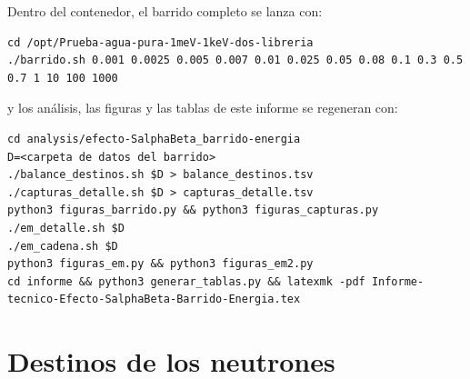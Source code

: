 \documentclass[11pt,a4paper]{article}
\renewcommand{\arraystretch}{1.18}
\begin{document}
Dentro del contenedor, el barrido completo se lanza con:
\begin{lstlisting}
cd /opt/Prueba-agua-pura-1meV-1keV-dos-libreria
./barrido.sh 0.001 0.0025 0.005 0.007 0.01 0.025 0.05 0.08 0.1 0.3 0.5 0.7 1 10 100 1000
\end{lstlisting}
y los análisis, las figuras y las tablas de este informe se regeneran con:
\begin{lstlisting}
cd analysis/efecto-SalphaBeta_barrido-energia
D=<carpeta de datos del barrido>
./balance_destinos.sh $D > balance_destinos.tsv
./capturas_detalle.sh $D > capturas_detalle.tsv
python3 figuras_barrido.py && python3 figuras_capturas.py
./em_detalle.sh $D
./em_cadena.sh $D
python3 figuras_em.py && python3 figuras_em2.py
cd informe && python3 generar_tablas.py && latexmk -pdf Informe-tecnico-Efecto-SalphaBeta-Barrido-Energia.tex
\end{lstlisting}

\appendix
\section{Destinos de los neutrones}
\label{app:destinos}

{\small\renewcommand{\arraystretch}{1.05}}
\end{document}
